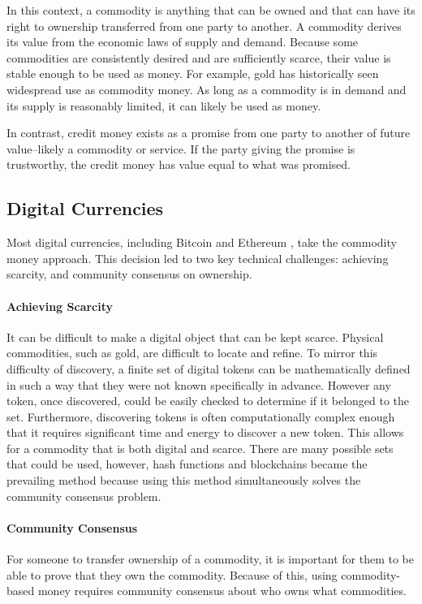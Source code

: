 \documentclass[runningheads]{llncs}
\begin{document}
In this context, a commodity is anything that can be owned and that can have its right to ownership transferred from one party to another. A commodity derives its value from the economic laws of supply and demand. Because some commodities are consistently desired and are sufficiently scarce, their value is stable enough to be used as money. For example, gold has historically seen widespread use as commodity money. As long as a commodity is in demand and its supply is reasonably limited, it can likely be used as money.

In contrast, credit money exists as a promise from one party to another of future value--likely a commodity or service. If the party giving the promise is trustworthy, the credit money has value equal to what was promised.

\subsection{Digital Currencies}
Most digital currencies, including Bitcoin and Ethereum \cite{bitcoin}, take the commodity money approach. This decision led to two key technical challenges: achieving scarcity, and community consensus on ownership.

\paragraph{Achieving Scarcity}
It can be difficult to make a digital object that can be kept scarce.
Physical commodities, such as gold, are difficult to locate and refine. To mirror this difficulty of discovery, a finite set of digital tokens can be mathematically defined in such a way that they were not known specifically in advance. However any token, once discovered, could be easily checked to determine if it belonged to the set. Furthermore, discovering tokens is often computationally complex enough that it requires significant time and energy to discover a new token. This allows for a commodity that is both digital and scarce.
There are many possible sets that could be used, however, hash functions and blockchains became the prevailing method because using this method simultaneously solves the community consensus problem.

\paragraph{Community Consensus}
For someone to transfer ownership of a commodity, it is important for them to be able to prove that they own the commodity. Because of this, using commodity-based money requires community consensus about who owns what commodities.
\end{document}
